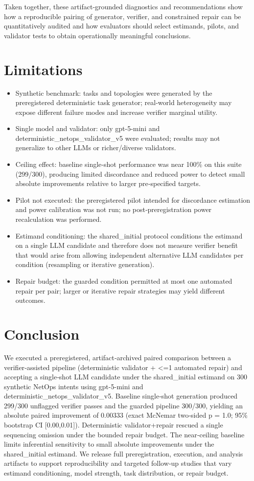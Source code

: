 \documentclass[conference]{IEEEtran}
\begin{document}
Taken together, these artifact‑grounded diagnostics and recommendations show how a reproducible pairing of generator, verifier, and constrained repair can be quantitatively audited and how evaluators should select estimands, pilots, and validator tests to obtain operationally meaningful conclusions.

\section{Limitations}
\begin{itemize}
\item Synthetic benchmark: tasks and topologies were generated by the preregistered deterministic task generator; real‑world heterogeneity may expose different failure modes and increase verifier marginal utility.
\item Single model and validator: only gpt-5-mini and deterministic\_netops\_validator\_v5 were evaluated; results may not generalize to other LLMs or richer/diverse validators.
\item Ceiling effect: baseline single‑shot performance was near 100\% on this suite (299/300), producing limited discordance and reduced power to detect small absolute improvements relative to larger pre‑specified targets.
\item Pilot not executed: the preregistered pilot intended for discordance estimation and power calibration was not run; no post‑preregistration power recalculation was performed.
\item Estimand conditioning: the shared\_initial protocol conditions the estimand on a single LLM candidate and therefore does not measure verifier benefit that would arise from allowing independent alternative LLM candidates per condition (resampling or iterative generation).
\item Repair budget: the guarded condition permitted at most one automated repair per pair; larger or iterative repair strategies may yield different outcomes.
\end{itemize}

\section{Conclusion}
We executed a preregistered, artifact‑archived paired comparison between a verifier‑assisted pipeline (deterministic validator + <=1 automated repair) and accepting a single‑shot LLM candidate under the shared\_initial estimand on 300 synthetic NetOps intents using gpt-5-mini and deterministic\_netops\_validator\_v5. Baseline single‑shot generation produced 299/300 unflagged verifier passes and the guarded pipeline 300/300, yielding an absolute paired improvement of 0.00333 (exact McNemar two‑sided p = 1.0; 95\% bootstrap CI [0.00,0.01]). Deterministic validator+repair rescued a single sequencing omission under the bounded repair budget. The near‑ceiling baseline limits inferential sensitivity to small absolute improvements under the shared\_initial estimand. We release full preregistration, execution, and analysis artifacts to support reproducibility and targeted follow‑up studies that vary estimand conditioning, model strength, task distribution, or repair budget.
\end{document}
